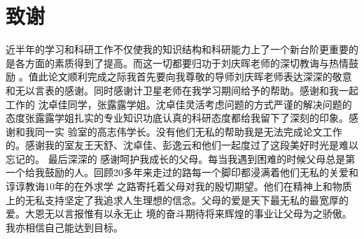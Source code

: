 
\chapter*{致谢}

近半年的学习和科研工作不仅使我的知识结构和科研能力上了一个新台阶更重要的是各方面的素质得到了提高。而这一切都要归功于刘庆晖老师的深切教诲与热情鼓励
。值此论文顺利完成之际我首先要向我尊敬的导师刘庆晖老师表达深深的敬意和无以言表的感谢。同时感谢计卫星老师在我学习期间给予的帮助。感谢和我一起工作的
沈卓佳同学，张露露学姐。沈卓佳灵活考虑问题的方式严谨的解决问题的态度张露露学姐扎实的专业知识功底认真的科研态度都给我留下了深刻的印象。感谢和我同一实
验室的高志伟学长。没有他们无私的帮助我是无法完成论文工作的。感谢我的室友王天舒、沈卓佳、彭逸云和他们一起度过了这段美好时光是难以忘记的。 最后深深的
感谢呵护我成长的父母。每当我遇到困难的时候父母总是第一个给我鼓励的人。回顾20多年来走过的路每一个脚印都浸满着他们无私的关爱和谆谆教诲10年的在外求学
之路寄托着父母对我的殷切期望。他们在精神上和物质上的无私支持坚定了我追求人生理想的信念。父母的爱是天下最无私的最宽厚的爱。大恩无以言报惟有以永无止
境的奋斗期待将来辉煌的事业让父母为之骄傲。我亦相信自己能达到目标。











